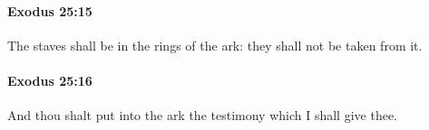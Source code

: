 		\paragraph{Exodus 25:15} %
			\label{EXODUS-25-15}

			The staves shall be in the rings of the ark: they shall not be taken from it.


		\paragraph{Exodus 25:16} %
			\label{EXODUS-25-16}

			And thou shalt put into the ark the testimony which I shall give thee.



